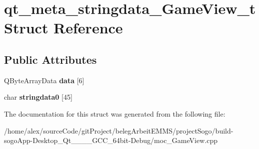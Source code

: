 \hypertarget{structqt__meta__stringdata__GameView__t}{\section{qt\-\_\-meta\-\_\-stringdata\-\_\-\-Game\-View\-\_\-t Struct Reference}
\label{structqt__meta__stringdata__GameView__t}
}
\subsection*{Public Attributes}
\begin{DoxyCompactItemize}
\item 
\hypertarget{structqt__meta__stringdata__GameView__t_aada02a37d2686d97fc6762c639505699}{Q\-Byte\-Array\-Data {\bfseries data} \mbox{[}6\mbox{]}}\label{structqt__meta__stringdata__GameView__t_aada02a37d2686d97fc6762c639505699}

\item 
\hypertarget{structqt__meta__stringdata__GameView__t_a392646c82f74aede139a046876818972}{char {\bfseries stringdata0} \mbox{[}45\mbox{]}}\label{structqt__meta__stringdata__GameView__t_a392646c82f74aede139a046876818972}

\end{DoxyCompactItemize}


The documentation for this struct was generated from the following file\-:\begin{DoxyCompactItemize}
\item 
/home/alex/source\-Code/git\-Project/beleg\-Arbeit\-E\-M\-M\-S/project\-Sogo/build-\/sogo\-App-\/\-Desktop\-\_\-\-Qt\-\_\-\_\-\_\-\_\-\-G\-C\-C\-\_\-64bit-\/\-Debug/moc\-\_\-\-Game\-View.\-cpp\end{DoxyCompactItemize}
